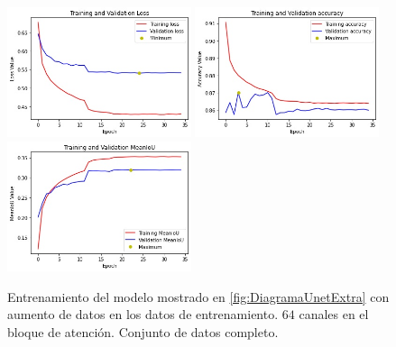 \begin{figure}[htpb]
  \centering
  \includegraphics[width=0.48\textwidth]{../../modelos-entrenados/unet-conv/ejecucion12/loss}
  \includegraphics[width=0.48\textwidth]{../../modelos-entrenados/unet-conv/ejecucion12/acc}
  \includegraphics[width=0.48\textwidth]{../../modelos-entrenados/unet-conv/ejecucion12/iou}
  \caption{Entrenamiento del modelo mostrado en \autoref{fig:DiagramaUnetExtra} con aumento de datos en los datos de entrenamiento. $64$ canales en el bloque de atención. Conjunto de datos completo.}
  \label{fig:ejec12}
\end{figure}
